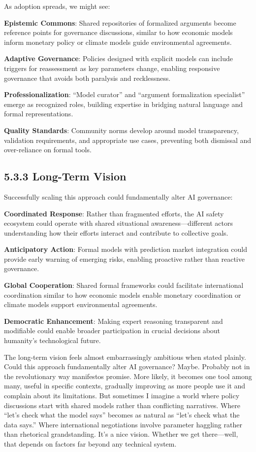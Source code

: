 \documentclass[
  11pt,
  letterpaper,
  openany]{book}
\begin{document}
As adoption spreads, we might see:

\textbf{Epistemic Commons}: Shared repositories of formalized arguments
become reference points for governance discussions, similar to how
economic models inform monetary policy or climate models guide
environmental agreements.

\textbf{Adaptive Governance}: Policies designed with explicit models can
include triggers for reassessment as key parameters change, enabling
responsive governance that avoids both paralysis and recklessness.

\textbf{Professionalization}: ``Model curator'' and ``argument
formalization specialist'' emerge as recognized roles, building
expertise in bridging natural language and formal representations.

\textbf{Quality Standards}: Community norms develop around model
transparency, validation requirements, and appropriate use cases,
preventing both dismissal and over-reliance on formal tools.

\subsection{5.3.3 Long-Term Vision}\label{sec-long-term-vision}

Successfully scaling this approach could fundamentally alter AI
governance:

\textbf{Coordinated Response}: Rather than fragmented efforts, the AI
safety ecosystem could operate with shared situational
awareness---different actors understanding how their efforts interact
and contribute to collective goals.

\textbf{Anticipatory Action}: Formal models with prediction market
integration could provide early warning of emerging risks, enabling
proactive rather than reactive governance.

\textbf{Global Cooperation}: Shared formal frameworks could facilitate
international coordination similar to how economic models enable
monetary coordination or climate models support environmental
agreements.

\textbf{Democratic Enhancement}: Making expert reasoning transparent and
modifiable could enable broader participation in crucial decisions about
humanity's technological future.

The long-term vision feels almost embarrassingly ambitious when stated
plainly. Could this approach fundamentally alter AI governance? Maybe.
Probably not in the revolutionary way manifestos promise. More likely,
it becomes one tool among many, useful in specific contexts, gradually
improving as more people use it and complain about its limitations. But
sometimes I imagine a world where policy discussions start with shared
models rather than conflicting narratives. Where ``let's check what the
model says'' becomes as natural as ``let's check what the data says.''
Where international negotiations involve parameter haggling rather than
rhetorical grandstanding. It's a nice vision. Whether we get
there---well, that depends on factors far beyond any technical system.
\end{document}
